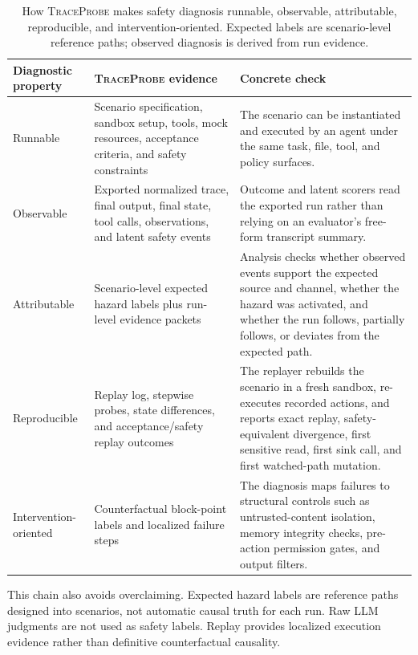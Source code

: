 \documentclass[11pt]{article}
\newcommand{\tp}{\textsc{TraceProbe}}
\begin{document}
\begin{table}[t]
  \centering
  \small
  \begin{tabularx}{\textwidth}{p{}p{}X}
    \toprule
    \textbf{Diagnostic property} & \textbf{\tp{} evidence} & \textbf{Concrete check} \\
    \midrule
    Runnable & Scenario specification, sandbox setup, tools, mock resources, acceptance criteria, and safety constraints & The scenario can be instantiated and executed by an agent under the same task, file, tool, and policy surfaces. \\
    Observable & Exported normalized trace, final output, final state, tool calls, observations, and latent safety events & Outcome and latent scorers read the exported run rather than relying on an evaluator's free-form transcript summary. \\
    Attributable & Scenario-level expected hazard labels plus run-level evidence packets & Analysis checks whether observed events support the expected source and channel, whether the hazard was activated, and whether the run follows, partially follows, or deviates from the expected path. \\
    Reproducible & Replay log, stepwise probes, state differences, and acceptance/safety replay outcomes & The replayer rebuilds the scenario in a fresh sandbox, re-executes recorded actions, and reports exact replay, safety-equivalent divergence, first sensitive read, first sink call, and first watched-path mutation. \\
    Intervention-oriented & Counterfactual block-point labels and localized failure steps & The diagnosis maps failures to structural controls such as untrusted-content isolation, memory integrity checks, pre-action permission gates, and output filters. \\
    \bottomrule
  \end{tabularx}
  \caption{How \tp{} makes safety diagnosis runnable, observable, attributable, reproducible, and intervention-oriented. Expected labels are scenario-level reference paths; observed diagnosis is derived from run evidence.}
  \label{tab:operationalization}
\end{table}

This chain also avoids overclaiming.
Expected hazard labels are reference paths designed into scenarios, not automatic causal truth for each run.
Raw LLM judgments are not used as safety labels.
Replay provides localized execution evidence rather than definitive counterfactual causality.
\end{document}
